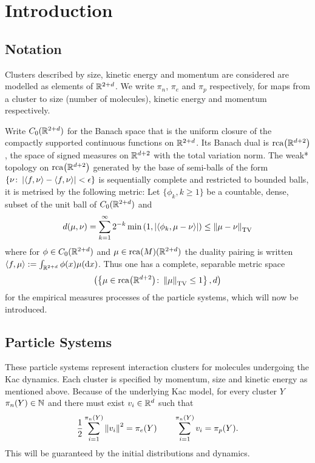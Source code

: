\section{Introduction}

\subsection{Notation}
Clusters described by size, kinetic energy and momentum are considered are modelled as elements of $\mathbb{R}^{2+d}$.
We write $\pi_n$, $\pi_e$ and $\pi_p$ respectively, for maps from a cluster to size (number of molecules), kinetic energy and momentum respectively.

Write $C_0(\mathbb{R}^{2+d})$ for the Banach space that is the uniform closure of the compactly supported continuous functions on $\mathbb{R}^{2+d}$.
Its Banach dual is $\mathrm{rca}{\left({\mathbb{R}^{d+2}}\right)}$, the space of signed measures on $\mathbb{R}^{d+2}$ with the total variation norm.
The weak* topology on $\mathrm{rca}{\left({\mathbb{R}^{d+2}}\right)}$ generated by the base of semi-balls of the form
$\left\{\nu \colon \left\lvert{\left<f,\nu\right> - \left<f,\nu\right>}\right\rvert < \epsilon \right\}$ is sequentially complete \cite[Corr 2.6.21]{Meg} and restricted to bounded balls, it is metrised by the following metric:  
Let $\{\phi_k, k\geq 1\}$ be a countable, dense, subset of the unit ball of $C_0(\mathbb{R}^{2+d})$ and
\begin{equation*} 
 d(\mu, \nu)=\sum_{k=1}^\infty 2^{-k} \min\left(1, |\langle \phi_k, \mu-\nu\rangle|\right)
 \leq \left\lVert{\mu - \nu}\right\rVert_{\mathrm{TV}}
\end{equation*}
where for $\phi\in C_0(\mathbb{R}^{2+d})$ and $\mu \in \mathrm{rca}{\left({M}\right)}(\mathbb{R}^{2+d})$ the duality pairing is written $\left<f,\mu\right> := \int_{\mathbb{R}^{2+d}} \phi(x) \mu(\mathrm{d} x)$.
Thus one has a complete, separable metric space
\begin{equation}
 \left(\left\{\mu \in \mathrm{rca}{\left({\mathbb{R}^{d+2}}\right)} \colon \left\lVert{\mu}\right\rVert_\mathrm{TV} \leq 1 \right\}, d\right)    
\end{equation}
for the empirical measures processes of the particle systems, which will now be introduced.




\subsection{Particle Systems}

These particle systems represent interaction clusters for molecules undergoing the Kac dynamics.
Each cluster is specified by momentum, size and kinetic energy as mentioned above.
Because of the underlying Kac model, for every cluster $Y$ $\pi_n(Y) \in \mathbb{N}$ and there must exist $v_i \in \mathbb{R}^d$ such that
\begin{equation}\label{eq:cluster-struct}
    \frac12 \sum_{i=1}^{\pi_n(Y)} \left\lVert{v_i}\right\rVert^2 = \pi_e(Y)
    \qquad
    \sum_{i=1}^{\pi_n(Y)} v_i = \pi_p(Y).
\end{equation}
This will be guaranteed by the initial distributions and dynamics.

